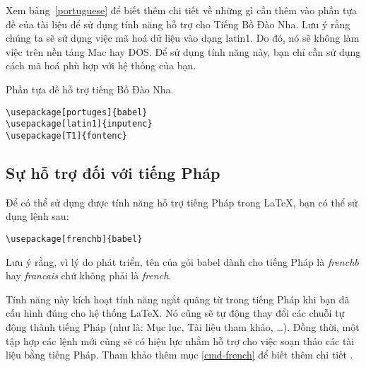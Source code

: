 Xem bảng~\ref{portuguese} để biết thêm chi tiết về những gì cần
thêm vào phần tựa đề của tài liệu để sử dụng tính năng hỗ trợ cho
Tiếng Bồ Đào Nha. Lưu ý rằng chúng ta sẽ sử dụng việc mã hoá dữ
liệu vào dạng latin1. Do đó, nó sẽ không làm việc trên nền tảng
Mac hay DOS. Để sử dụng tính năng này, bạn chỉ cần sử dụng cách mã
hoá phù hợp với hệ thống của bạn.

\begin{table}[btp]
\caption{Phần tựa đề hỗ trợ tiếng Bồ Đào Nha.} \label{portuguese}
\begin{lined}{5cm}
\begin{verbatim}
\usepackage[portuges]{babel}
\usepackage[latin1]{inputenc}
\usepackage[T1]{fontenc}
\end{verbatim}
\bigskip
\end{lined}
\end{table}


\subsection{Sự hỗ trợ đối với tiếng Pháp}
Để có thể sử dụng được tính năng hỗ trợ tiếng Pháp trong \LaTeX{},
bạn có thể sử dụng lệnh sau:

\begin{lscommand}
\verb|\usepackage[frenchb]{babel}|
\end{lscommand}

Lưu ý rằng, vì lý do phát triển, tên của gói \textsf{babel} dành
cho tiếng Pháp là \emph{frenchb} hay \emph{francais} chứ không
phải là \emph{french}.

Tính năng này kích hoạt tính năng ngắt quãng từ trong tiếng Pháp
khi bạn đã cấu hình đúng cho hệ thống \LaTeX{}. Nó cũng sẽ tự động
thay đổi các chuỗi tự động thành tiếng Pháp (như là: Mục lục, Tài
liệu tham khảo, \ldots). Đồng thời, một tập hợp các lệnh mới cũng
sẽ có hiệu lực nhằm hỗ trợ cho việc soạn thảo các tài liệu bằng
tiếng Pháp. Tham khảo thêm mục \ref{cmd-french} để biết thêm chi
tiết .

